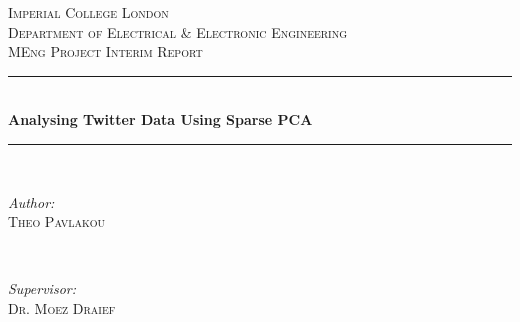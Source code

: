 \documentclass[11pt,a4paper]{article}
\begin{document}
\begin{titlepage}

\newcommand{\HRule}{\rule{\linewidth}{0.5mm}} %

\center %
 

\textsc{\LARGE Imperial College London}\\[1.5cm] %
\textsc{\Large Department of Electrical \& Electronic Engineering}\\[0.5cm] %
\textsc{\large MEng Project Interim Report}\\[0.5cm] %


\HRule \\[0.4cm]
{ \huge \bfseries Analysing Twitter Data Using Sparse PCA}\\[0.4cm] %
\HRule \\[1.5cm]
 

\begin{minipage}{0.4\textwidth}
\begin{flushleft} \large
\emph{Author:}\\
 \textsc{Theo Pavlakou} %
\end{flushleft}
\end{minipage}
~
\begin{minipage}{0.4\textwidth}
\begin{flushright} \large
\emph{Supervisor:} \\
\textsc{Dr. Moez Draief} %
\end{flushright}
\end{minipage}\\[4cm]



\end{titlepage}
\end{document}
